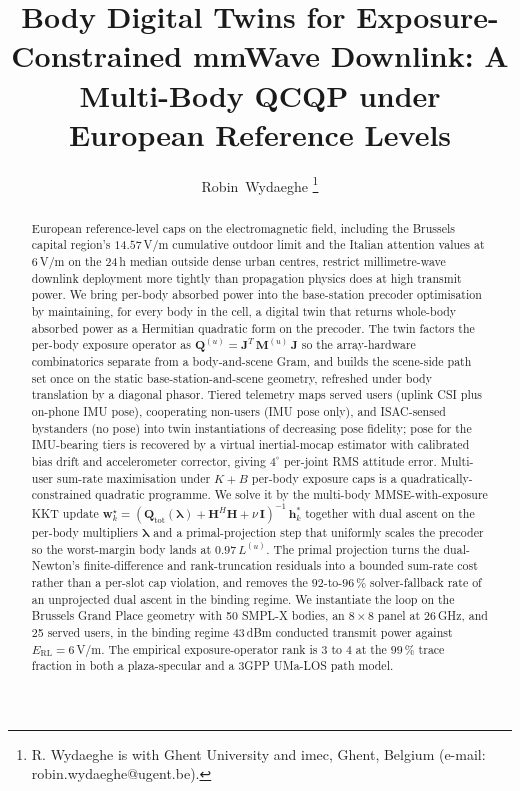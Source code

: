 \documentclass[journal,twocolumn,10pt]{IEEEtran}
\title{Body Digital Twins for Exposure-Constrained mmWave Downlink:
A Multi-Body QCQP under European Reference Levels}
\author{Robin~Wydaeghe%
  \thanks{R. Wydaeghe is with Ghent University and imec, Ghent, Belgium
  (e-mail: robin.wydaeghe@ugent.be).}}
\theoremstyle{plain}
\theoremstyle{remark}
\newcommand{\hh}{\mathbf{h}}
\newcommand{\ww}{\mathbf{w}}
\newcommand{\Qmat}{\mathbf{Q}}
\newcommand{\Mmat}{\mathbf{M}}
\newcommand{\Jmat}{\mathbf{J}}
\begin{document}
\maketitle

\begin{abstract}
European reference-level caps on the electromagnetic field, including
the Brussels capital region's $14.57\,$V/m cumulative outdoor limit
and the Italian attention values at $6\,$V/m on the $24\,$h median
outside dense urban centres, restrict millimetre-wave downlink
deployment more tightly than propagation physics does at high
transmit power. We bring per-body absorbed power into the
base-station precoder optimisation by maintaining, for every body in
the cell, a digital twin that returns whole-body absorbed power as a
Hermitian quadratic form on the precoder. The twin factors the
per-body exposure operator as $\Qmat^{(u)} = \Jmat^T\,\Mmat^{(u)}\,
\Jmat$ so the array-hardware combinatorics separate from a
body-and-scene Gram, and builds the scene-side path set once on the
static base-station-and-scene geometry, refreshed under body
translation by a diagonal phasor. Tiered telemetry maps served users
(uplink CSI plus on-phone IMU pose), cooperating non-users (IMU pose
only), and ISAC-sensed bystanders (no pose) into twin instantiations
of decreasing pose fidelity; pose for the IMU-bearing tiers is
recovered by a virtual inertial-mocap estimator with calibrated bias
drift and accelerometer corrector, giving $4^\circ$ per-joint RMS
attitude error. Multi-user sum-rate maximisation under $K + B$
per-body exposure caps is a quadratically-constrained quadratic
programme. We solve it by the multi-body MMSE-with-exposure
KKT update
$\ww_k^\star = (\Qmat_{\mathrm{tot}}(\bm\lambda) + \mathbf{H}^H
\mathbf{H} + \nu\,\mathbf{I})^{-1}\,\hh_k^*$ together with dual ascent
on the per-body multipliers $\bm\lambda$ and a primal-projection step
that uniformly scales the precoder so the worst-margin body lands at
$0.97\,L^{(u)}$. The primal projection turns the dual-Newton's
finite-difference and rank-truncation residuals into a bounded
sum-rate cost rather than a per-slot cap violation, and removes the
$92$-to-$96\,\%$ solver-fallback rate of an unprojected dual ascent
in the binding regime. We instantiate the loop on the Brussels Grand
Place geometry with 50 SMPL-X bodies, an $8 \times 8$ panel at
$26\,$GHz, and 25 served users, in the binding regime $43\,$dBm
conducted transmit power against $E_{\mathrm{RL}} = 6\,$V/m. The
empirical exposure-operator rank is 3 to 4 at the $99\,\%$ trace
fraction in both a plaza-specular and a 3GPP UMa-LOS path model.

\end{abstract}
\end{document}
